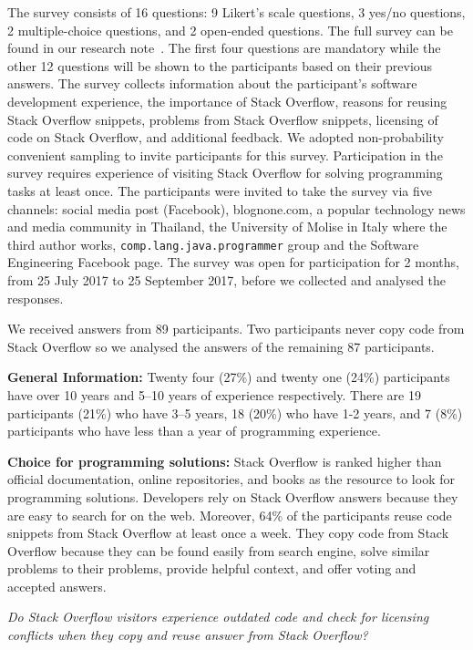\documentclass[a4paper,twoside,10pt]{reviewresponse}
\begin{document}
The survey consists of 16 questions: 9 Likert's
scale questions, 3 yes/no questions, 2 multiple-choice questions, and 2
open-ended questions. 
The full survey can be found in our research note~\citep{Ragkhitwetsagul_RN2017}.
The first four questions are mandatory while the other 12
questions will be shown to the participants based on their previous answers. 
The survey collects information about the participant's software development
experience, the importance of Stack Overflow, reasons for reusing Stack Overflow
snippets, problems from Stack Overflow snippets, licensing of code on Stack
Overflow, and additional feedback. 
We adopted non-probability convenient sampling to invite participants for this
survey. Participation in the survey requires experience of visiting Stack
Overflow for solving programming tasks at least once. The participants were
invited to take the survey via five channels: social media post (Facebook),
\textsf{blognone.com}, a popular technology news and media community in Thailand, the University of Molise in Italy where the third author
works, \texttt{comp.lang.java.programmer} group and the Software Engineering
Facebook page. 
The survey was open for participation for 2 months, 
from 25 July 2017 to 25 September 2017, before we collected and analysed
the responses.

We received answers from 89 participants. 
Two participants never
copy code from Stack Overflow so we analysed the answers of the remaining 87
participants.

\textbf{General Information: }
Twenty four (27\%) and twenty one (24\%) participants have over 10 years and 5--10
years of experience respectively. There are 19 participants (21\%) who have 3--5
years, 18 (20\%) who have 1-2 years, and 7 (8\%) participants who have less than a
year of programming experience.

\textbf{Choice for programming solutions: }
Stack Overflow is ranked higher than official documentation, online
repositories, and books as the resource to look for programming solutions.
Developers rely on Stack Overflow answers because they are easy to search for on
the web. Moreover, 64\% of the participants reuse code snippets from Stack
Overflow at least once a week. They copy code from Stack Overflow because they
can be found easily from search engine, solve similar problems to their
problems, provide helpful context, and offer voting and accepted answers. 

\vspace{0.25cm}
\textit{Do Stack Overflow
	visitors experience outdated code and check for licensing conflicts when
	they copy and reuse answer from Stack Overflow?}
\vspace{0.25cm}
\end{document}
